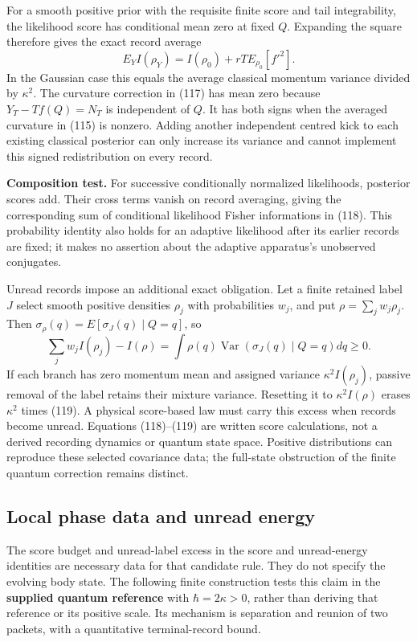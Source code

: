\documentclass[11pt,a4paper]{article}
\begin{document}
For a smooth positive prior with the requisite finite score and tail
integrability, the likelihood score has conditional mean zero at fixed
\(Q\). Expanding the square therefore gives the exact record average
\[E_Y I(\rho_Y)=I(\rho_0)+rT E_{\rho_0}[f'^2].\tag{118}\] In the
Gaussian case this equals the average classical momentum variance
divided by \(\kappa^2\). The curvature correction in (117) has mean zero
because \(Y_T-Tf(Q)=N_T\) is independent of \(Q\). It has both signs
when the averaged curvature in (115) is nonzero. Adding another
independent centred kick to each existing classical posterior can only
increase its variance and cannot implement this signed redistribution on
every record.

\textbf{Composition test.} For successive conditionally normalized
likelihoods, posterior scores add. Their cross terms vanish on record
averaging, giving the corresponding sum of conditional likelihood Fisher
informations in (118). This probability identity also holds for an
adaptive likelihood after its earlier records are fixed; it makes no
assertion about the adaptive apparatus's unobserved conjugates.

Unread records impose an additional exact obligation. Let a finite
retained label \(J\) select smooth positive densities \(\rho_j\) with
probabilities \(w_j\), and put \(\rho=\sum_jw_j\rho_j\). Then
\(\sigma_\rho(q)=E[\sigma_J(q)\mid Q=q]\), so
\[\sum_jw_j I(\rho_j)-I(\rho)
 =\int\rho(q)\operatorname{Var}(\sigma_J(q)\mid Q=q)dq
 \ge0.\tag{119}\] If each branch has zero momentum mean and assigned
variance \(\kappa^2 I(\rho_j)\), passive removal of the label retains
their mixture variance. Resetting it to \(\kappa^2 I(\rho)\) erases
\(\kappa^2\) times (119). A physical score-based law must carry this
excess when records become unread. Equations (118)--(119) are written
score calculations, not a derived recording dynamics or quantum state
space. Positive distributions can reproduce these selected covariance
data; the full-state obstruction of the finite quantum correction
remains distinct.

\hypertarget{local-phase-data-and-unread-energy}{%
\subsection{Local phase data and unread
energy}\label{local-phase-data-and-unread-energy}}

The score budget and unread-label excess in the score and unread-energy
identities are necessary data for that candidate rule. They do not
specify the evolving body state. The following finite construction tests
this claim in the \textbf{supplied quantum reference} with
\(\hbar=2\kappa>0\), rather than deriving that reference or its positive
scale. Its mechanism is separation and reunion of two packets, with a
quantitative terminal-record bound.
\end{document}
